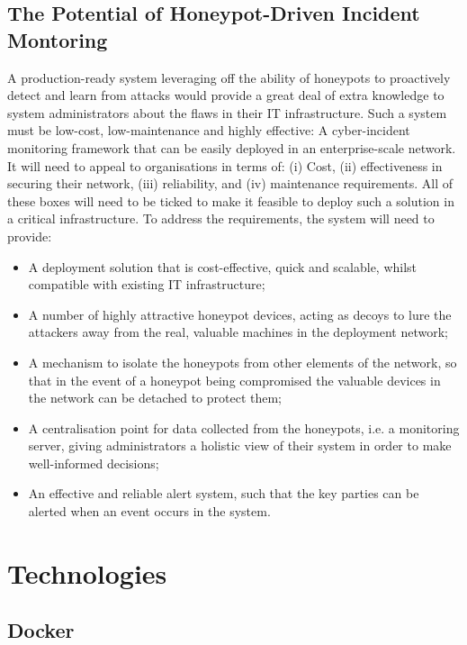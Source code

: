 	\subsection{The Potential of Honeypot-Driven Incident Montoring}
	A production-ready system leveraging off the ability of honeypots to proactively detect and learn from attacks would provide a great deal of extra knowledge to system administrators about the flaws in their IT infrastructure. Such a system must be low-cost, low-maintenance and highly effective: A cyber-incident monitoring framework that can be easily deployed in an enterprise-scale network. It will need to appeal to organisations in terms of: (i) Cost, (ii) effectiveness in securing their network, (iii) reliability, and (iv) maintenance requirements. All of these boxes will need to be ticked to make it feasible to deploy such a solution in a critical infrastructure. To address the requirements, the system will need to provide: 
	
	\begin{itemize}
		\item A deployment solution that is cost-effective, quick and scalable, whilst compatible with existing IT infrastructure; 
		
		\item A number of highly attractive honeypot devices, acting as decoys to lure the attackers away from the real, valuable machines in the deployment network; 
		
		\item A mechanism to isolate the honeypots from other elements of the network, so that in the event of a honeypot being compromised the valuable devices in the network can be detached to protect them; 
		
		\item A centralisation point for data collected from the honeypots, i.e. a monitoring server, giving administrators a holistic view of their system in order to make well-informed decisions; 
		
		\item An effective and reliable alert system, such that the key parties can be alerted when an event occurs in the system.
		
	\end{itemize}

\section{Technologies}
\subsection{Docker}

